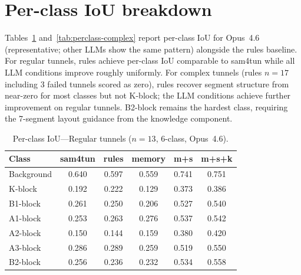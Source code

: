 \section{Per-class IoU breakdown}\label{app:perclass}

Tables~\ref{tab:perclass-regular} and~\ref{tab:perclass-complex} report per-class IoU for Opus~4.6 (representative; other LLMs show the same pattern) alongside the rules baseline. For regular tunnels, rules achieve per-class IoU comparable to sam4tun while all LLM conditions improve roughly uniformly. For complex tunnels (rules $n=17$ including 3 failed tunnels scored as zero), rules recover segment structure from near-zero for most classes but not K-block; the LLM conditions achieve further improvement on regular tunnels. B2-block remains the hardest class, requiring the 7-segment layout guidance from the knowledge component.

\begin{table}[ht]
\caption{Per-class IoU---Regular tunnels ($n=13$, 6-class, Opus~4.6).}\label{tab:perclass-regular}
\begin{tabular*}{\tblwidth}{@{} l c c c c c @{}}
\toprule
Class & sam4tun & rules & memory & m+s & m+s+k \\
\midrule
Background & 0.640 & 0.597 & 0.559 & 0.741 & 0.751 \\
K-block & 0.192 & 0.222 & 0.129 & 0.373 & 0.386 \\
B1-block & 0.261 & 0.250 & 0.206 & 0.527 & 0.540 \\
A1-block & 0.253 & 0.263 & 0.276 & 0.537 & 0.542 \\
A2-block & 0.150 & 0.144 & 0.159 & 0.380 & 0.420 \\
A3-block & 0.286 & 0.289 & 0.259 & 0.519 & 0.550 \\
B2-block & 0.256 & 0.236 & 0.232 & 0.534 & 0.558 \\
\bottomrule
\end{tabular*}
\end{table}

